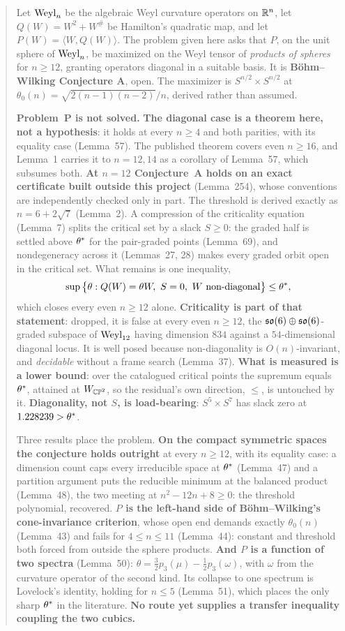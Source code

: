 \begin{abstract}
\noindent
Let $\Weyl_n$ be the algebraic Weyl curvature operators on $\R^n$, let $Q(W)=W^2+W^{\#}$ be Hamilton's quadratic map, and let $P(W)=\langle W,Q(W)\rangle$. The problem given here asks that $P$, on the unit sphere of $\Weyl_n$, be maximized on the Weyl tensor of \emph{products of spheres} for $n\ge12$, granting operators diagonal in a suitable basis. It is \textbf{B\"ohm--Wilking Conjecture A}, open. The maximizer is $S^{n/2}\times S^{n/2}$ at $\theta_0(n)=\sqrt{2(n-1)(n-2)}/n$, derived rather than assumed.

\textbf{Problem~P is not solved.} \textbf{The diagonal case is a theorem here, not a hypothesis}: it holds at every $n\ge4$ and both parities, with its equality case (Lemma~57). The published theorem covers even $n\ge16$, and Lemma~1 carries it to $n=12,14$ as a corollary of Lemma~57, which subsumes both. \textbf{At $n=12$ Conjecture~A holds on an exact certificate built outside this project} (Lemma~254), whose conventions are independently checked only in part. The threshold is derived exactly as $n=6+2\sqrt7$ (Lemma~2). A compression of the criticality equation (Lemma~7) splits the critical set by a slack $S\ge0$: the graded half is settled above $\thstar$ for the pair-graded points (Lemma~69), and nondegeneracy across it (Lemmas~27, 28) makes every graded orbit open in the critical set. What remains is one inequality,
\[
\sup\big\{\theta:Q(W)=\theta W,\ S=0,\ W\text{ non-diagonal}\big\}\le\thstar ,
\]
which closes every even $n\ge12$ alone. \textbf{Criticality is part of that statement}: dropped, it is false at every even $n\ge12$, the $\so(6)\oplus\so(6)$-graded subspace of $\Weyl_{12}$ having dimension $834$ against a $54$-dimensional diagonal locus. It is well posed because non-diagonality is $O(n)$-invariant, and \emph{decidable} without a frame search (Lemma~37). \textbf{What is measured is a lower bound}: over the catalogued critical points the supremum equals $\thstar$, attained at $W_{\CP^2}$, so the residual's own direction, $\le$, is untouched by it. \textbf{Diagonality, not $S$, is load-bearing}: $S^5\times S^7$ has slack zero at $1.228239>\thstar$.

Three results place the problem. \textbf{On the compact symmetric spaces the conjecture holds outright} at every $n\ge12$, with its equality case: a dimension count caps every irreducible space at $\thstar$ (Lemma~47) and a partition argument puts the reducible minimum at the balanced product (Lemma~48), the two meeting at $n^2-12n+8\ge0$: the threshold polynomial, recovered. \textbf{$P$ is the left-hand side of B\"ohm--Wilking's cone-invariance criterion}, whose open end demands exactly $\theta_0(n)$ (Lemma~43) and fails for $4\le n\le11$ (Lemma~44): constant and threshold both forced from outside the sphere products. \textbf{And $P$ is a function of two spectra} (Lemma~50): $\theta=\tfrac32p_3(\mu)-\tfrac12p_3(\omega)$, with $\omega$ from the curvature operator of the second kind. Its collapse to one spectrum is Lovelock's identity, holding for $n\le5$ (Lemma~51), which places the only sharp $\thstar$ in the literature. \textbf{No route yet supplies a transfer inequality coupling the two cubics.}


\end{abstract}
